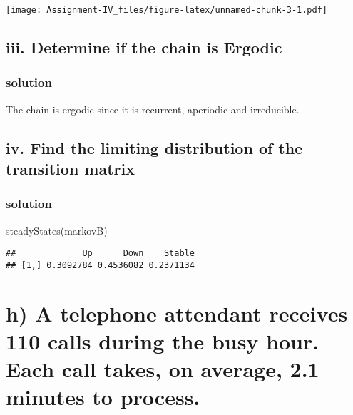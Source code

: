 \documentclass[
]{article}
\newenvironment{Shaded}{\begin{snugshade}}{\end{snugshade}}
\newcommand{\FunctionTok}[1]{\textcolor[rgb]{0.00,0.00,0.00}{#1}}
\newcommand{\NormalTok}[1]{#1}
\begin{document}
\texttt{[image: Assignment-IV\_files/figure-latex/unnamed-chunk-3-1.pdf]}

\hypertarget{iii.-determine-if-the-chain-is-ergodic}{%
\subsection{iii. Determine if the chain is
Ergodic}\label{iii.-determine-if-the-chain-is-ergodic}}

\hypertarget{solution-3}{%
\subsubsection{solution}\label{solution-3}}

The chain is ergodic since it is recurrent, aperiodic and irreducible.

\hypertarget{iv.-find-the-limiting-distribution-of-the-transition-matrix}{%
\subsection{iv. Find the limiting distribution of the transition
matrix}\label{iv.-find-the-limiting-distribution-of-the-transition-matrix}}

\hypertarget{solution-4}{%
\subsubsection{solution}\label{solution-4}}

\begin{Shaded}
\begin{Highlighting}[]
\FunctionTok{steadyStates}\NormalTok{(markovB)}
\end{Highlighting}
\end{Shaded}

\begin{verbatim}
##             Up      Down    Stable
## [1,] 0.3092784 0.4536082 0.2371134
\end{verbatim}

\hypertarget{h-a-telephone-attendant-receives-110-calls-during-the-busy-hour.-each-call-takes-on-average-2.1-minutes-to-process.}{%
\section{h) A telephone attendant receives 110 calls during the busy
hour. Each call takes, on average, 2.1 minutes to
process.}\label{h-a-telephone-attendant-receives-110-calls-during-the-busy-hour.-each-call-takes-on-average-2.1-minutes-to-process.}}
\end{document}

